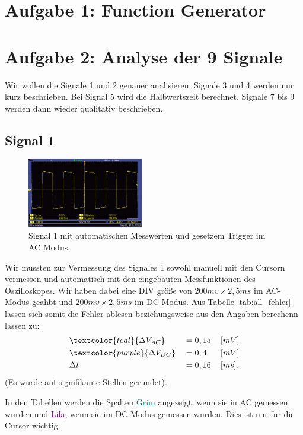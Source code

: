 \twocolumn

\section{Aufgabe 1: Function Generator}

\section{Aufgabe 2: Analyse der 9 Signale}

Wir wollen die Signale 1 und 2 genauer analisieren. Signale 3 und 4 werden nur kurz beschrieben. Bei Signal 5 wird die Halbwertszeit berechnet. Signale 7 bis 9 werden dann wieder qualitativ beschrieben.
\subsection*{Signal 1}
\begin{figure} [h!]
    \centering
        \includegraphics[width=0.45\textwidth]{img/25/Signale2/Signal1-Messwerte.pdf}
    \caption{Signal 1 mit automatischen Messwerten und gesetzem Trigger im AC Modus.}
\end{figure}
Wir mussten zur Vermessung des Signales 1 sowohl manuell mit den Cursorn vermessen und automatisch mit den eingebauten Messfunktionen des Oszilloskopes.
Wir haben dabei eine DIV größe von $200mv \times 2,5ms$ im AC-Modus geahbt und $200mv \times 2,5ms$ im DC-Modus. Aus \hyperref[tab:all_fehler]{Tabelle \ref*{tab:all_fehler}} lassen sich somit die Fehler ablesen beziehungsweise aus den Angaben berechenn lassen zu:
\begin{align}
    &\textcolor{teal}{\Delta V_{AC}} &&= 0,15\, &&[mV] \\
    &\textcolor{purple}{\Delta V_{DC}} &&= 0,4\, &&[mV] \\
    &\Delta t &&= 0,16 \, &&[ms].
\end{align}
(Es wurde auf signifikante Stellen gerundet).

In den Tabellen werden die Spalten \textcolor{teal}{Grün} angezeigt, wenn sie in AC gemessen wurden und \textcolor{purple}{Lila}, wenn sie im DC-Modus gemessen wurden. Dies ist nur für die Cursor wichtig.

